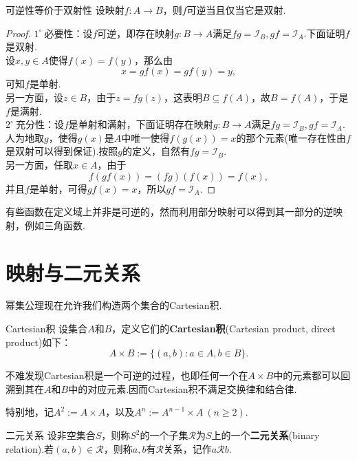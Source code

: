\documentclass[lang=cn, zihao=5]{elegantbook}
\newcommand{\buzhou}[1]{$#1^{\circ} \ $}
\begin{document}
\begin{proposition}{可逆性等价于双射性}
	设映射$f:A \to B$，则$f$可逆当且仅当它是双射.
\end{proposition}
\begin{proof}
	\buzhou{1}必要性：设$f$可逆，即存在映射$g:B \to A$满足$fg=\mathcal{I}_B,gf=\mathcal{I}_A$.下面证明$f$是双射. \\
	设$x,y \in A$使得$f(x)=f(y)$，那么由$$x=gf(x)=gf(y)=y,$$可知$f$是单射. \\
	另一方面，设$z \in B$，由于$z=fg(z)$，这表明$B \subseteq f(A)$，故$B = f(A)$，于是$f$是满射. \\
	\buzhou{2}充分性：设$f$是单射和满射，下面证明存在映射$g:B \to A$满足$fg=\mathcal{I}_B,gf=\mathcal{I}_A$. \\
	人为地取$g$，使得$g(x)$是$A$中唯一使得$f(g(x))=x$的那个元素(唯一存在性由$f$是双射可以得到保证).按照$g$的定义，自然有$fg=\mathcal{I}_B$. \\
	另一方面，任取$x \in A$，由于$$f(gf(x)) = (fg)(f(x)) = f(x),$$并且$f$是单射，可得$gf(x)=x$，所以$gf=\mathcal{I}_A$.
\end{proof}

有些函数在定义域上并非是可逆的，然而利用部分映射可以得到其一部分的逆映射，例如三角函数.

\section{映射与二元关系}

幂集公理现在允许我们构造两个集合的Cartesian积.

\begin{definition}{Cartesian积}
	设集合$A$和$B$，定义它们的\textbf{Cartesian积}(Cartesian product, direct product)如下：$$A \times B := \{ (a,b):a \in A,b \in B \}.$$
\end{definition}
\begin{remark}
	不难发现Cartesian积是一个可逆的过程，也即任何一个在$A \times B$中的元素都可以回溯到其在$A$和$B$中的对应元素.因而Cartesian积不满足交换律和结合律.
\end{remark}
\begin{remark}
	特别地，记$A^2:=A \times A$，以及$A^n := A^{n-1} \times A~(n \geq 2)$.
\end{remark}

\begin{definition}{二元关系}
	设非空集合$S$，则称$S^2$的一个子集$\mathcal{R}$为$S$上的一个\textbf{二元关系}(binary relation).若$(a,b) \in \mathcal{R}$，则称$a,b$有$\mathcal{R}$关系，记作$a\mathcal{R}b$.
\end{definition}
\end{document}
